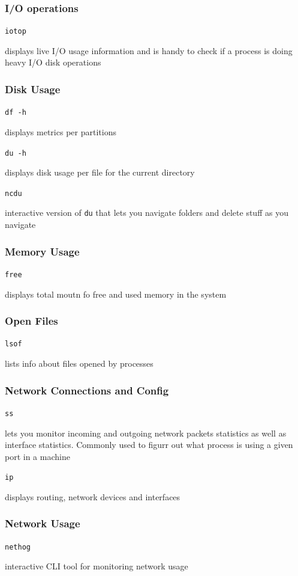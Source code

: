 \documentclass[letterpaper,12pt]{article}
\newcommand*{\lstitem}[1]{
  \setbox0\hbox{\lstinline{#1}}
  \item[\usebox0]
}
\begin{document}
\subsubsection{I/O operations}
\begin{description}
 \lstitem{iotop} displays live I/O usage information and is handy to check if a process is doing heavy I/O disk operations
\end{description}

\subsubsection{Disk Usage}
\begin{description}
 \lstitem{df -h} displays metrics per partitions
 \lstitem{du -h} displays disk usage per file for the current directory
 \lstitem{ncdu} interactive version of \lstinline{du} that lets you navigate folders and delete stuff as you navigate
\end{description}

\subsubsection{Memory Usage}
\begin{description}
 \lstitem{free} displays total moutn fo free and used memory in the system
\end{description}

\subsubsection{Open Files}
\begin{description}
 \lstitem{lsof} lists info about files opened by processes
\end{description}

\subsubsection{Network Connections and Config}
\begin{description}
 \lstitem{ss} lets you monitor incoming and outgoing network packets statistics as well as interface statistics. Commonly used to figurr out what process is using a given port in a machine
 \lstitem{ip} displays routing, network devices and interfaces
\end{description}

\subsubsection{Network Usage}
\begin{description}
 \lstitem{nethog} interactive CLI tool for monitoring network usage
\end{description}
\end{document}
